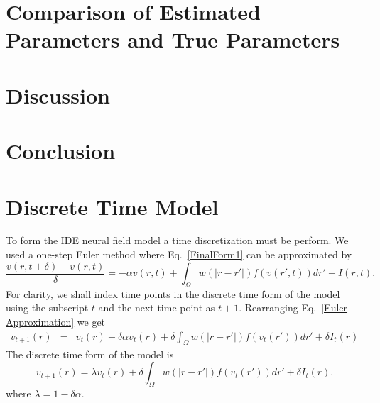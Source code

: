 \documentclass[onecolumn,draftcls]{IEEEtran}
\begin{document}
\section{Comparison of Estimated Parameters and True Parameters}

\section{Discussion}

\section{Conclusion}

\appendices

\section{Discrete Time Model}\label{Time Discretization}
To form the IDE neural field model a time discretization must be perform. We used a one-step Euler method where Eq.~\ref{FinalForm1} can be approximated by
\begin{equation}\label{Euler Approximation}	
\frac{v\left( r,t+\delta \right) - v\left( r,t\right)}{\delta} =   -\alpha v\left( r,t \right) + \int_\Omega  {w\left( |r-r'| \right)f\left( {v\left( r',t \right)} \right)dr'} + I\left(r,t\right).
\end{equation}
For clarity, we shall index time points in the discrete time form of the model using the subscript $t$ and the next time point as $t+1$. Rearranging Eq.~\ref{Euler Approximation} we get
\begin{eqnarray}\label{Euler Approximation}	
v_{t+1}\left( r\right) &=& v_t\left( r\right) -\delta \alpha v_t\left( r\right) + \delta \int_\Omega  {w\left( |r-r'| \right)f\left( {v_t\left( r'\right)} \right)dr'} + \delta I_t\left(r\right)
\end{eqnarray}
The discrete time form of the model is
\begin{equation}\label{Discrete Time Model1}
	v_{t+1}\left(r\right) = \lambda v_t\left(r\right) + \delta \int_\Omega { w\left(|r-r'|\right) f\left(v_t\left(r'\right)\right) dr'} + \delta I_t\left(r\right).
\end{equation}
where $\lambda = 1 - \delta \alpha$.
\end{document}
